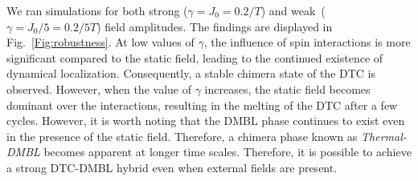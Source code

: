 \documentclass[12pt]{iopart}
\begin{document}
We ran simulations for both strong ($\gamma= J_0=0.2/T$) and weak ($ \gamma=J_0/5 = 0.2/5T$) field amplitudes. The findings are displayed in Fig.~\ref{Fig:robustness}. At low values of $\gamma$, the influence of spin interactions is more significant compared to the static field, leading to the continued existence of dynamical localization. Consequently, a stable chimera state of the DTC is observed. However, when the value of $\gamma$ increases, the static field becomes dominant over the interactions, resulting in the melting of the DTC after a few cycles. However, it is worth noting that the DMBL phase continues to exist even in the presence of the static field. Therefore, a chimera phase known as \textit{Thermal-DMBL} becomes apparent at longer time scales. Therefore, it is possible to achieve a strong DTC-DMBL hybrid even when external fields are present.
	
\end{document}
